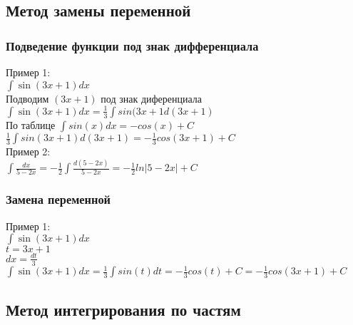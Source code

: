 \documentclass[12pt,a4paper]{article}
\begin{document}
\subsection{Метод замены переменной}
\subsubsection{Подведение функции под знак дифференциала}
Пример 1: \\
$ \int{\sin(3x + 1)dx} $ \\
Подводим $ (3x+1) $ под знак диференциала \\
$ \int{\sin(3x + 1)dx} = \frac{1}{3}\int{sin(3x+1}d(3x+1) $ \\
По таблице $ \int{sin(x)dx} = -cos(x) + C $ \\
$ \frac{1}{3}\int{sin(3x+1)d(3x+1)} = -\frac{1}{3}cos(3x+1) + C $
\\
Пример 2: \\
$ \int{\frac{dx}{5 - 2x}} = -\frac{1}{2}\int{\frac{d(5-2x)}{5 - 2x}}
= -\frac{1}{2}ln|5-2x|+C $

\subsubsection{Замена переменной}
Пример 1: \\
$ \int{\sin(3x + 1)dx} $ \\
$ t = 3x + 1 $ \\
$ dx = \frac{dt}{3} $ \\
$ \int{\sin(3x + 1)dx} = \frac{1}{3}\int{sin(t)dt} = -\frac{1}{3}cos(t) + C = -\frac{1}{3}cos(3x+1) + C $ 
\subsection{Метод интегрирования по частям}
\end{document}
